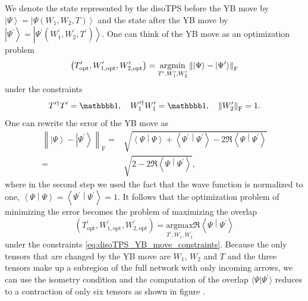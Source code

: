 We denote the state represented by the disoTPS before the YB move by $\left|\Psi\right\rangle = \left|\Psi\left(W_1, W_2, T\right)\right\rangle$ and the state after the YB move by $\left|\Psi^\prime\right\rangle = \left|\Psi^\prime\left(W_1^\prime, W_2^\prime, T^\prime\right)\right\rangle$. One can think of the YB move as an optimization problem
\begin{equation}
	\label{eq:disoTPS_YB_move_standard}
	\left(T^\prime_\text{opt},W_{1,\text{opt}}^\prime,W_{2,\text{opt}}^\prime\right) = \underset{T^\prime,W_1^\prime,W_2^\prime}{\operatorname{argmin}}\left\lVert \left|\Psi\right\rangle - \left|\Psi^\prime\right\rangle\right\rVert_\text{F}
\end{equation}
under the constraints
\begin{equation}
	\label{eq:disoTPS_YB_move_constraints}
	T^{\prime\dagger}T^\prime = \id, \quad W_1^{\prime\dagger}W_1^\prime = \id, \quad \left\lVert W_2^\prime \right\rVert_\text{F} = 1.
\end{equation}
One can rewrite the error of the YB move as
\begin{equation}
	\label{eq:disoTPS_YB_move_rewritten_error}
	\begin{split}
		\left\lVert \left|\Psi\right\rangle - \left|\Psi^\prime\right\rangle \right\rVert_\text{F} =& \sqrt{\left\langle\Psi\middle|\Psi\right\rangle + \left\langle\Psi^\prime\middle|\Psi^\prime\right\rangle - 2\Re\left\langle\Psi\middle|\Psi^\prime\right\rangle} \\
		=& \sqrt{2 - 2\Re\left\langle\Psi\middle|\Psi^\prime\right\rangle},
	\end{split}
\end{equation}
where in the second step we used the fact that the wave function is normalized to one, $\left\langle\Psi\middle|\Psi\right\rangle = \left\langle\Psi^\prime\middle|\Psi^\prime\right\rangle = 1$. It follows that the optimization problem of minimizing the error becomes the problem of maximizing the overlap
\begin{equation}
	\label{eq:disoTPS_YB_move_alternative_formulation}
	\left(T^\prime_\text{opt},W_{1,\text{opt}}^\prime,W_{2,\text{opt}}^\prime\right) = \underset{T^\prime,W_1^\prime,W_2^\prime}{\text{argmax}}\Re\left\langle\Psi\middle|\Psi^\prime\right\rangle
\end{equation}
under the constraints \eqref{eq:disoTPS_YB_move_constraints}. Because the only tensors that are changed by the YB move are $W_1$, $W_2$ and $T$ and the three tensors make up a subregion of the full network with only incoming arrows, we can use the isometry condition and the computation of the overlap $\langle\Psi|\Psi^\prime\rangle$ reduces to a contraction of only six tensors as shown in figure .\par
